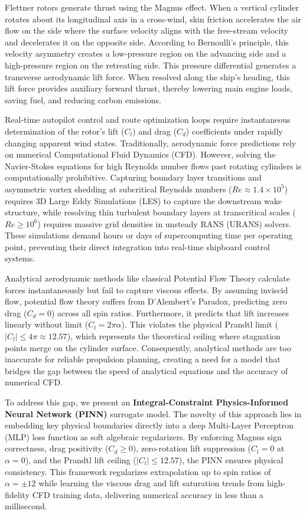 \documentclass[aip,pof,reprint,onecolumn,amsmath,amssymb,graphicx,longbibliography]{revtex4-2}
\begin{document}
Flettner rotors generate thrust using the Magnus effect. When a vertical cylinder rotates about its longitudinal axis in a cross-wind, skin friction accelerates the air flow on the side where the surface velocity aligns with the free-stream velocity and decelerates it on the opposite side. According to Bernoulli's principle, this velocity asymmetry creates a low-pressure region on the advancing side and a high-pressure region on the retreating side. This pressure differential generates a transverse aerodynamic lift force. When resolved along the ship's heading, this lift force provides auxiliary forward thrust, thereby lowering main engine loads, saving fuel, and reducing carbon emissions.

Real-time autopilot control and route optimization loops require instantaneous determination of the rotor's lift ($C_l$) and drag ($C_d$) coefficients under rapidly changing apparent wind states. Traditionally, aerodynamic force predictions rely on numerical Computational Fluid Dynamics (CFD). However, solving the Navier-Stokes equations for high Reynolds number flows past rotating cylinders is computationally prohibitive. Capturing boundary layer transitions and asymmetric vortex shedding at subcritical Reynolds numbers ($Re \approx 1.4 \times 10^5$) requires 3D Large Eddy Simulations (LES)\cite{karabelas2010} to capture the downstream wake structure, while resolving thin turbulent boundary layers at transcritical scales ($Re \ge 10^6$) requires massive grid densities in unsteady RANS (URANS)\cite{karabelas2012} solvers. These simulations demand hours or days of supercomputing time per operating point, preventing their direct integration into real-time shipboard control systems.

Analytical aerodynamic methods like classical Potential Flow Theory calculate forces instantaneously but fail to capture viscous effects. By assuming inviscid flow, potential flow theory suffers from D'Alembert's Paradox, predicting zero drag ($C_d = 0$) across all spin ratios. Furthermore, it predicts that lift increases linearly without limit ($C_l = 2\pi\alpha$). This violates the physical Prandtl limit ($|C_l| \le 4\pi \approx 12.57$)\cite{prandtl1925}, which represents the theoretical ceiling where stagnation points merge on the cylinder surface. Consequently, analytical methods are too inaccurate for reliable propulsion planning, creating a need for a model that bridges the gap between the speed of analytical equations and the accuracy of numerical CFD.

To address this gap, we present an \textbf{Integral-Constraint Physics-Informed Neural Network (PINN)} surrogate model. The novelty of this approach lies in embedding key physical boundaries directly into a deep Multi-Layer Perceptron (MLP) loss function as soft algebraic regularizers. By enforcing Magnus sign correctness, drag positivity ($C_d \ge 0$), zero-rotation lift suppression ($C_l = 0$ at $\alpha = 0$), and the Prandtl lift ceiling ($|C_l| \le 12.57$), the PINN ensures physical consistency. This framework regularizes extrapolation up to spin ratios of $\alpha = \pm 12$ while learning the viscous drag and lift saturation trends from high-fidelity CFD training data, delivering numerical accuracy in less than a millisecond.
\end{document}
